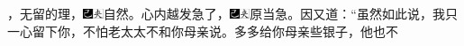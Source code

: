 ，无留的理，{\includegraphics[width=3mm]{../Images/00003}\includegraphics[width=3mm]{../Images/00012}\footnotesize \kaishu 自然。}心内越发急了，{\includegraphics[width=3mm]{../Images/00003}\includegraphics[width=3mm]{../Images/00012}\footnotesize \kaishu 原当急。}因又道：“虽然如此说，我只一心留下你，不怕老太太不和你母亲说。多多给你母亲些银子，他也不